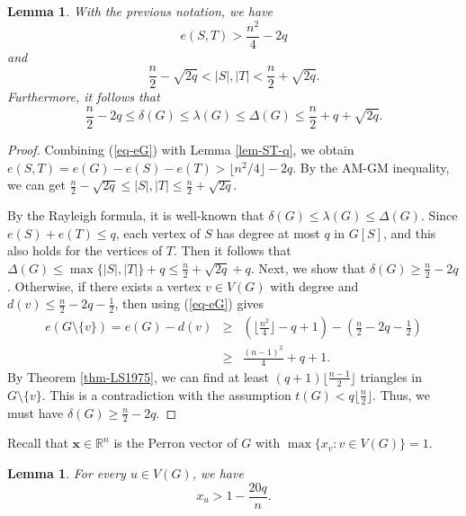 \documentclass[11pt]{article}
\newtheorem{lemma}[theorem]{Lemma}
\begin{document}
\begin{lemma} \label{refine-degree}
With the previous notation, we have  
\[ e(S,T) > \frac{n^2}{4}  - 2q   \]
and 
 \[ \frac{n}{2} -  \sqrt{2q} < |S|, |T| 
 < \frac{n}{2} +\sqrt{2q}.  \]
Furthermore, it follows that  
\[  \frac{n}{2} -2q \le \delta(G) \le 
\lambda (G)\le \Delta (G) \le \frac{n}{2} + q + \sqrt{2q}.  \]
\end{lemma}

\begin{proof}
Combining (\ref{eq-eG}) with Lemma \ref{lem-ST-q},  we obtain 
$e(S,T) =e(G) - e(S) -e(T) > \lfloor n^2/4\rfloor - 2q$. 
By the AM-GM inequality, we can get 
$\frac{n}{2} - \sqrt{2q} \le |S|, |T| \le \frac{n}{2} +\sqrt{2q}$. 

By the Rayleigh formula, it is well-known that 
$\delta(G) \le 
\lambda (G)\le \Delta (G) $. 
Since $e(S) + e(T)\le q$,  
each vertex of $S$ has degree 
at most $q$ in $G[S]$, and this also holds for the vertices of $T$. 
Then it follows that $\Delta (G) \le 
\max\{|S|,|T|\} +q \le \frac{n}{2} + \sqrt{2q} +q$. 
Next, we show that $\delta (G)\ge \frac{n}{2} -2q$. 
Otherwise, if there exists a vertex $v\in V(G)$ with degree and $d(v) \le \frac{n}{2} - 2q  - \frac{1}{2}$, then using (\ref{eq-eG}) gives 
\begin{eqnarray*} 
e(G \setminus \{v\})  = e(G) - d(v) 
&\ge & \left( \Big\lfloor  \frac{n^2}{4} \Big\rfloor   -q +1 \right) 
- \left( \frac{n}{2} -2q - \frac{1}{2} \right)  \\
& \ge &\frac{(n-1)^2}{4} +q +1.
\end{eqnarray*}   
By Theorem \ref{thm-LS1975}, we can find at least 
$(q+1)\lfloor \frac{n-1}{2} \rfloor$ triangles in 
$G \setminus \{v\}$. This is a contradiction with 
the assumption $t(G)< q\lfloor \frac{n}{2}\rfloor$. Thus, we must have $\delta (G)\ge \frac{n}{2} -2q $. 
\end{proof}

Recall that $\bm{x}\in \mathbb{R}^n$ is the Perron vector of $G$ with $\max\{x_v: v\in V(G)\}=1$. 


\begin{lemma} \label{eigen-entry}
For every $u\in V(G)$, we have 
\[  {x}_u > 1- \frac{20q}{n}. \]  
\end{lemma}
\end{document}
